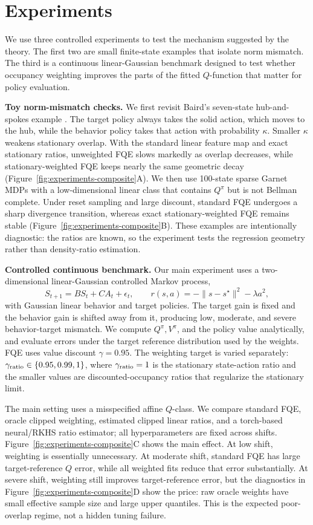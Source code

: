 \section{Experiments}
\label{sec:experiments}

We use three controlled experiments to test the mechanism suggested by the
theory. The first two are small finite-state examples that isolate norm
mismatch. The third is a continuous linear-Gaussian benchmark designed to test
whether occupancy weighting improves the parts of the fitted \(Q\)-function that
matter for policy evaluation.

\textbf{Toy norm-mismatch checks.}
We first revisit Baird's seven-state hub-and-spokes example
\citep{baird1995residual}. The target policy always takes the solid action,
which moves to the hub, while the behavior policy takes that action with
probability \(\kappa\). Smaller \(\kappa\) weakens stationary overlap. With the
standard linear feature map and exact stationary ratios, unweighted FQE slows
markedly as overlap decreases, while stationary-weighted FQE keeps nearly the
same geometric decay (Figure~\ref{fig:experiments-composite}A). We then use
100-state sparse Garnet MDPs with a low-dimensional linear class that contains
\(Q^\pi\) but is not Bellman complete. Under reset sampling and large discount,
standard FQE undergoes a sharp divergence transition, whereas exact
stationary-weighted FQE remains stable (Figure~\ref{fig:experiments-composite}B).
These examples are intentionally diagnostic: the ratios are known, so the
experiment tests the regression geometry rather than density-ratio estimation.

\textbf{Controlled continuous benchmark.}
Our main experiment uses a two-dimensional linear-Gaussian controlled Markov
process,
\[
S_{t+1}=B S_t + C A_t+\epsilon_t,\qquad
r(s,a)=-\|s-s^\star\|^2-\lambda a^2 ,
\]
with Gaussian linear behavior and target policies. The target gain is fixed and
the behavior gain is shifted away from it, producing low, moderate, and severe
behavior-target mismatch. We compute \(Q^\pi,V^\pi\), and the policy value
analytically, and evaluate errors under the target reference distribution used
by the weights. FQE uses value discount \(\gamma=0.95\). The weighting target is
varied separately: \(\gamma_{\rm ratio}\in\{0.95,0.99,1\}\), where
\(\gamma_{\rm ratio}=1\) is the stationary state-action ratio and the smaller
values are discounted-occupancy ratios that regularize the stationary limit.

The main setting uses a misspecified affine \(Q\)-class. We compare standard
FQE, oracle clipped weighting, estimated clipped linear ratios, and a
torch-based neural/RKHS ratio estimator; all hyperparameters are fixed across
shifts. Figure~\ref{fig:experiments-composite}C shows the main effect. At low
shift, weighting is essentially unnecessary. At moderate shift, standard FQE has
large target-reference \(Q\) error, while all weighted fits reduce that error
substantially. At severe shift, weighting still improves target-reference error,
but the diagnostics in Figure~\ref{fig:experiments-composite}D show the price:
raw oracle weights have small effective sample size and large upper quantiles.
This is the expected poor-overlap regime, not a hidden tuning failure.

